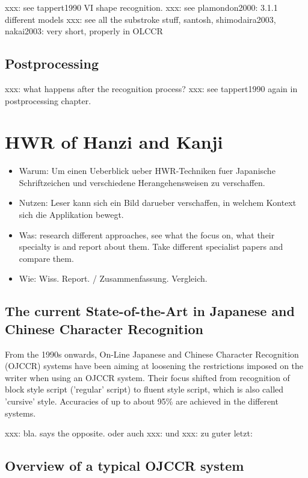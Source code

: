 xxx: see tappert1990 VI shape recognition.
xxx: see plamondon2000: 3.1.1 different models
xxx: see all the substroke stuff, santosh, shimodaira2003, nakai2003: very short, properly in OLCCR

\subsection{Postprocessing}
\label{sec:postprocessing}

xxx: what happens after the recognition process?
xxx: see tappert1990 again in postprocessing chapter.

\section{HWR of Hanzi and Kanji}
\begin{itemize}
\item Warum: Um einen Ueberblick ueber HWR-Techniken fuer Japanische 
  Schriftzeichen und verschiedene Herangehensweisen zu verschaffen.
\item Nutzen: Leser kann sich ein Bild darueber verschaffen,
  in welchem Kontext sich die Applikation bewegt.
\item Was: research different approaches, see what the focus on, 
  what their specialty is and report about them. Take different specialist 
  papers and compare them.
\item Wie: Wiss. Report. / Zusammenfassung. Vergleich. 
\end{itemize}

\subsection{The current State-of-the-Art in Japanese and Chinese Character Recognition}
From the 1990s onwards, On-Line Japanese and Chinese Character Recognition 
(OJCCR) systems have been aiming at loosening the restrictions imposed on 
the writer when using an OJCCR system. Their focus shifted from recognition 
of block style script ('regular' script) to fluent style script, 
which is also called 'cursive' style. Accuracies of up to about 95\% are
achieved in the different systems.


xxx: bla.  says the opposite. \cite{ChenLee1996} oder auch 
xxx: \cite{Nakagawa2008} und \cite{Nakai2003} 
xxx: zu guter letzt: \cite{Santosh2009}

\subsection{Overview of a typical OJCCR system}

